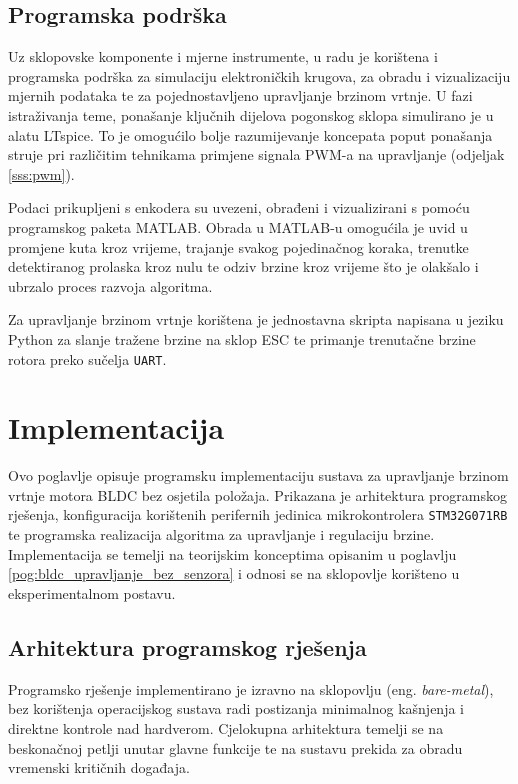 \documentclass[diplomskirad]{fer}
\begin{document}
\section{Programska podrška}
\label{sec:programska_podrska}

Uz sklopovske komponente i mjerne instrumente, u radu je korištena i programska
podrška za simulaciju elektroničkih krugova, za obradu i vizualizaciju mjernih
podataka te za pojednostavljeno upravljanje brzinom vrtnje. U fazi istraživanja
teme, ponašanje ključnih dijelova pogonskog sklopa simulirano je u alatu
LTspice. To je omogućilo bolje razumijevanje koncepata poput ponašanja struje
pri različitim tehnikama primjene signala PWM-a na upravljanje (odjeljak
\ref{sss:pwm}).

Podaci prikupljeni s enkodera su uvezeni, obrađeni i vizualizirani s pomoću
programskog paketa MATLAB. Obrada u MATLAB-u omogućila je uvid u promjene kuta
kroz vrijeme, trajanje svakog pojedinačnog koraka, trenutke detektiranog
prolaska kroz nulu te odziv brzine kroz vrijeme što je olakšalo i ubrzalo
proces razvoja algoritma.

Za upravljanje brzinom vrtnje korištena je jednostavna skripta napisana u
jeziku Python za slanje tražene brzine na sklop ESC te primanje trenutačne
brzine rotora preko sučelja \texttt{UART}.

\chapter{Implementacija}
\label{pog:implementacija}

Ovo poglavlje opisuje programsku implementaciju sustava za upravljanje brzinom
vrtnje motora BLDC bez osjetila položaja. Prikazana je arhitektura programskog
rješenja, konfiguracija korištenih perifernih jedinica mikrokontrolera
\texttt{STM32G071RB} te programska realizacija algoritma za upravljanje i
regulaciju brzine. Implementacija se temelji na teorijskim konceptima opisanim
u poglavlju \ref{pog:bldc_upravljanje_bez_senzora} i odnosi se na sklopovlje
korišteno u eksperimentalnom postavu.

\section{Arhitektura programskog rješenja}
\label{sec:arhitektura_rjesenja}

Programsko rješenje implementirano je izravno na sklopovlju (eng.
\textit{bare-metal}), bez korištenja operacijskog sustava radi postizanja
minimalnog kašnjenja i direktne kontrole nad hardverom. Cjelokupna arhitektura
temelji se na beskonačnoj petlji unutar glavne funkcije te na sustavu prekida
za obradu vremenski kritičnih događaja.
\end{document}
